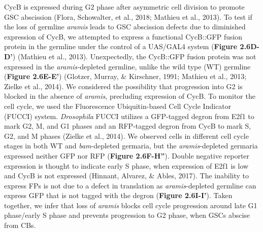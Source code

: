 \documentclass[12pt,oneside]{reedthesis}
\begin{document}
CycB is expressed during G2 phase after asymmetric cell division to
promote GSC abscission (Flora, Schowalter, et al., 2018; Mathieu et al., 2013). To test if the
loss of germline \emph{aramis} leads to GSC abscission defects due to
diminished expression of CycB, we attempted to express a functional
CycB::GFP fusion protein in the germline under the control of a UAS/GAL4
system (\textbf{Figure 2.6D-D'}) (Mathieu et al., 2013). Unexpectedly, the
CycB::GFP fusion protein was not expressed in the \emph{aramis-}depleted
germline, unlike the wild type (WT) germline (\textbf{Figure 2.6E-E'})
(Glotzer, Murray, \& Kirschner, 1991; Mathieu et al., 2013; Zielke et al., 2014).
We considered the possibility that progression into G2 is blocked in the
absence of \emph{aramis}, precluding expression of CycB. To monitor the cell
cycle, we used the Fluorescence Ubiquitin-based Cell Cycle Indicator
(FUCCI) system. \emph{Drosophila} FUCCI utilizes a GFP-tagged degron from
E2f1 to mark G2, M, and G1 phases and an RFP-tagged degron from CycB to
mark S, G2, and M phases (Zielke et al., 2014). We observed cells in
different cell cycle stages in both WT and \emph{bam}-depleted germaria, but
the \emph{aramis}-depleted germaria expressed neither GFP nor RFP (\textbf{Figure 2.6F-H''}). Double negative reporter expression is thought to indicate
early S phase, when expression of E2f1 is low and CycB is not expressed
(Hinnant, Alvarez, \& Ables, 2017). The inability to express FPs is
not due to a defect in translation as \emph{aramis}-depleted germline can
express GFP that is not tagged with the degron (\textbf{Figure 2.6I-I'}).
Taken together, we infer that loss of \emph{aramis} blocks cell cycle
progression around late G1 phase/early S phase and prevents progression
to G2 phase, when GSCs abscise from CBs.
\end{document}
